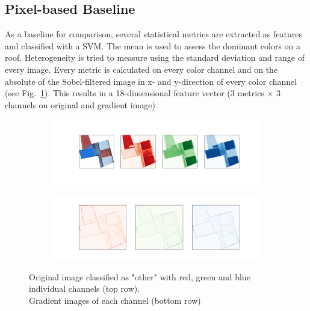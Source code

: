 \documentclass[11pt]{article}
\begin{document}
	\subsection{Pixel-based Baseline } 
	\label{sec:pixel_based}
	As a baseline for comparison, several statistical metrics are extracted as features and classified with a SVM. The mean is used to assess the dominant colors on a roof. Heterogeneity is tried to measure using the standard deviation and range of every image. Every metric is calculated on every color channel and on the absolute of the Sobel-filtered image in x- and y-direction of every color channel (see Fig.~\ref{fig:pixel_based}). This results in a 18-dimensional feature vector (3 metrics $\times$ 3 channels on original and gradient image).
	
	\begin{figure}
		\centering
		\begin{subfigure}[t]{\textwidth}
			\centering
			\includegraphics[width=\textwidth, trim={3cm 3cm 3cm 3cm},clip]{figures/pixel_based/rgb_channels.png}
		\end{subfigure}
		\begin{subfigure}[b]{.8\textwidth}
			\includegraphics[width=.95\textwidth, trim={2cm 1.5cm 2cm 1.5cm},clip]{figures/pixel_based/sobel.png}
		\end{subfigure}
		\caption{Original image classified as "other" with red, green and blue individual channels (top row). \\ Gradient images of each channel (bottom row)}
		\label{fig:pixel_based}
	\end{figure}
	
\end{document}
